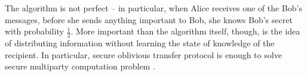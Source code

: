 \documentclass[10pt]{article}
\begin{document}
The algorithm is not perfect -- in particular, when Alice receives one of the Bob's messages, before
she sends anything important to Bob, she knows Bob's secret with probability \(\frac{1}{2}\). More
important than the algorithm itself, though, is the idea of distributing information without learning
the state of knowledge of the recipient. In particular, secure oblivious transfer protocol is enough
to solve secure multiparty computation problem \cite{Kilian88}.


\nocite{*}



\end{document}
